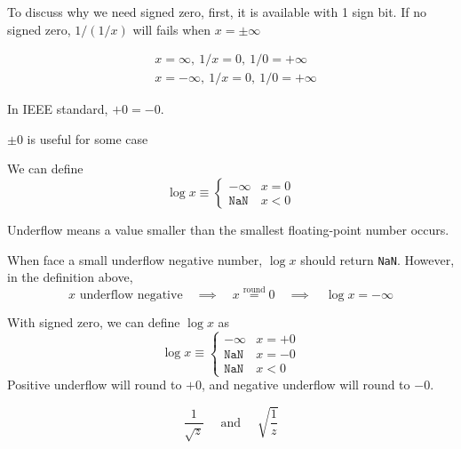 To discuss why we need signed zero, first, it is available with 1 sign bit. If no signed zero, \(1/(1/x)\) will fails when $x = \pm \infty$

\begin{equation*}
    \begin{split}
        &x = \infty,\ 1/x = 0,\ 1/0 = + \infty \\
        &x = - \infty,\ 1/x = 0,\ 1/0 = +\infty
    \end{split}
\end{equation*}

\begin{definition}
    In IEEE standard, $+0 = -0$.
\end{definition}

\newpage

$\pm 0$ is useful for some case 

\begin{eg}
    We can define \[
        \log x \equiv \begin{cases}
            - \infty & x = 0 \\
            \texttt{NaN} & x < 0
        \end{cases}
    \]
\end{eg}

\begin{definition}[Underflow]
    Underflow means a value smaller than the smallest floating-point number occurs.
\end{definition}

When face a small underflow negative number, $\log x$ should return \texttt{NaN}. However, in the definition above, 
\[
    \boxed{x \text{ underflow negative}} \quad \implies \quad \boxed{x \overset{\text{round}}{=} 0} \quad \implies \quad \boxed{\log x = -\infty}
\]

With signed zero, we can define $\log x$ as
\[
    \log x \equiv \begin{cases}
        -\infty & x = +0 \\
        \texttt{NaN} & x = -0 \\
        \texttt{NaN} & x < 0
    \end{cases}
\]
Positive underflow will round to $+0$, and negative underflow will round to $-0$.

\begin{eg}
\[
    \frac{1}{\sqrt{z}} \quad \text{ and } \quad \sqrt{\frac{1}{z}}
\]
\end{eg}

